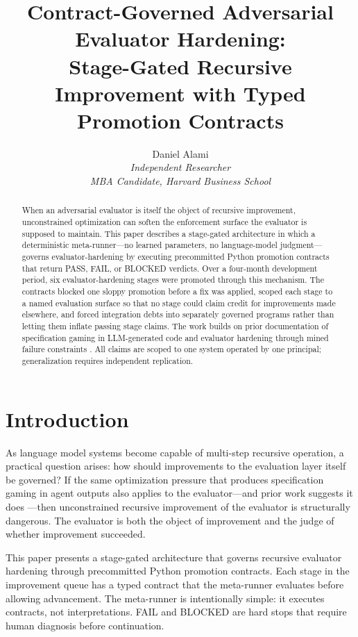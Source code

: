 \documentclass[11pt]{article}
\title{Contract-Governed Adversarial Evaluator Hardening:\\Stage-Gated Recursive Improvement with Typed Promotion Contracts}
\author{Daniel Alami \\
\normalsize \textit{Independent Researcher} \\
\normalsize \textit{MBA Candidate, Harvard Business School}}
\date{}
\begin{document}
\maketitle

\begin{abstract}
When an adversarial evaluator is itself the object of recursive improvement, unconstrained optimization can soften the enforcement surface the evaluator is supposed to maintain. This paper describes a stage-gated architecture in which a deterministic meta-runner---no learned parameters, no language-model judgment---governs evaluator-hardening by executing precommitted Python promotion contracts that return PASS, FAIL, or BLOCKED verdicts. Over a four-month development period, six evaluator-hardening stages were promoted through this mechanism. The contracts blocked one sloppy promotion before a fix was applied, scoped each stage to a named evaluation surface so that no stage could claim credit for improvements made elsewhere, and forced integration debts into separately governed programs rather than letting them inflate passing stage claims. The work builds on prior documentation of specification gaming in LLM-generated code \citep{alami2025a} and evaluator hardening through mined failure constraints \citep{alami2025b}. All claims are scoped to one system operated by one principal; generalization requires independent replication.
\end{abstract}


\section{Introduction}

As language model systems become capable of multi-step recursive operation, a practical question arises: how should improvements to the evaluation layer itself be governed? If the same optimization pressure that produces specification gaming in agent outputs \citep{alami2025a} also applies to the evaluator---and prior work suggests it does \citep{alami2025b}---then unconstrained recursive improvement of the evaluator is structurally dangerous. The evaluator is both the object of improvement and the judge of whether improvement succeeded.

This paper presents a stage-gated architecture that governs recursive evaluator hardening through precommitted Python promotion contracts. Each stage in the improvement queue has a typed contract that the meta-runner evaluates before allowing advancement. The meta-runner is intentionally simple: it executes contracts, not interpretations. FAIL and BLOCKED are hard stops that require human diagnosis before continuation.
\end{document}
